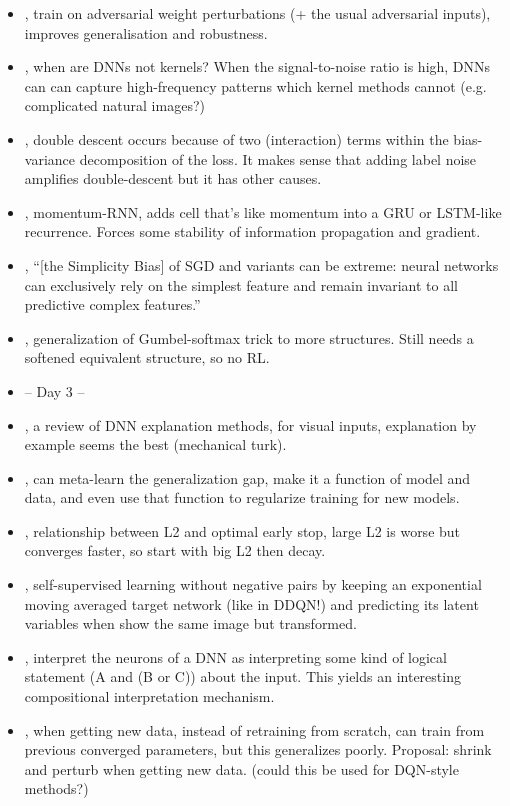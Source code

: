 \begin{itemize}
\item \citet{wu2020adversarial}, train on adversarial weight perturbations (+ the usual adversarial inputs), improves generalisation and robustness.
\item \citet{ghorbani2020neural}, when are DNNs not kernels? When the signal-to-noise ratio is high, DNNs can can capture high-frequency patterns which kernel methods cannot (e.g. complicated natural images?)
\item \citet{adlam2020understanding}, double descent occurs because of two (interaction) terms within the bias-variance decomposition of the loss. It makes sense that adding label noise amplifies double-descent but it has other causes.
\item \citet{nguyen2020momentumrnn}, momentum-RNN, adds cell that's like momentum into a GRU or LSTM-like recurrence. Forces some stability of information propagation and gradient.
\item \citet{shah2020pitfalls}, ``[the Simplicity Bias] of SGD and variants can be extreme: neural networks can exclusively rely on the simplest feature and remain invariant to all predictive complex features.''
\item \citet{paulus2020gradient}, generalization of Gumbel-softmax trick to more structures. Still needs a softened equivalent structure, so no RL.
\item -- Day 3 --
\item \citet{jeyakumar2020can}, a review of DNN explanation methods, for visual inputs, explanation by example seems the best (mechanical turk).
\item \citet{lee2020neural}, can meta-learn the generalization gap, make it a function of model and data, and even use that function to regularize training for new models.
\item \citet{lewkowycz2020training}, relationship between L2 and optimal early stop, large L2 is worse but converges faster, so start with big L2 then decay.
\item \citet{grill2020bootstrap}, self-supervised learning without negative pairs by keeping an exponential moving averaged target network (like in DDQN!) and predicting its latent variables when show the same image but transformed.
\item \citet{mu2020compositional}, interpret the neurons of a DNN as interpreting some kind of logical statement (A and (B or C)) about the input. This yields an interesting compositional interpretation mechanism.
\item \citet{ash2020warm}, when getting new data, instead of retraining from scratch, can train from previous converged parameters, but this generalizes poorly. Proposal: shrink and perturb when getting new data. (could this be used for DQN-style methods?)

\end{itemize}
